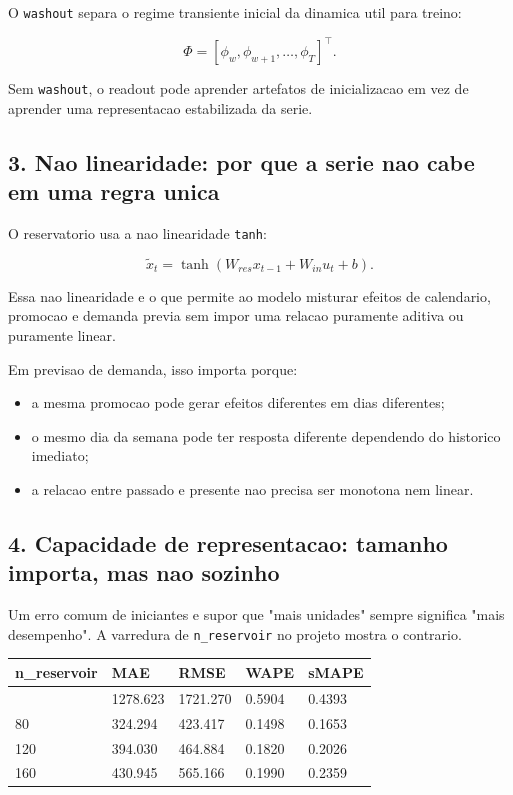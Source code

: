 \documentclass[12pt]{article}
\providecommand{\tightlist}{%
          \setlength{\itemsep}{0pt}\setlength{\parskip}{0pt}}
\begin{document}
O \texttt{washout} separa o regime transiente inicial da dinamica util para treino:

\[
\Phi = [\phi_w, \phi_{w+1}, \dots, \phi_T]^\top.
\]

Sem \texttt{washout}, o readout pode aprender artefatos de inicializacao em vez de aprender uma representacao estabilizada da serie.

\subsection{3. Nao linearidade: por que a serie nao cabe em uma regra unica}\label{3-nao-linearidade-por-que-a-serie-nao-cabe-em-uma-regra-unica}

O reservatorio usa a nao linearidade \texttt{tanh}:

\[
\widetilde{x}_t = \tanh(W_{res} x_{t-1} + W_{in} u_t + b).
\]

Essa nao linearidade e o que permite ao modelo misturar efeitos de calendario, promocao e demanda previa sem impor uma relacao puramente aditiva ou puramente linear.

Em previsao de demanda, isso importa porque:

\begin{itemize}
\tightlist
\item
  a mesma promocao pode gerar efeitos diferentes em dias diferentes;
\item
  o mesmo dia da semana pode ter resposta diferente dependendo do historico imediato;
\item
  a relacao entre passado e presente nao precisa ser monotona nem linear.
\end{itemize}

\subsection{4. Capacidade de representacao: tamanho importa, mas nao sozinho}\label{4-capacidade-de-representacao-tamanho-importa-mas-nao-sozinho}

Um erro comum de iniciantes e supor que "mais unidades" sempre significa "mais desempenho". A varredura de \texttt{n\_reservoir} no projeto mostra o contrario.

\begin{longtable}[]{@{}lllll@{}}
\toprule\noalign{}
n\_reservoir & MAE & RMSE & WAPE & sMAPE \\
\midrule\noalign{}
\endhead
\bottomrule\noalign{}
\endlastfoot
40 & 1278.623 & 1721.270 & 0.5904 & 0.4393 \\
80 & 324.294 & 423.417 & 0.1498 & 0.1653 \\
120 & 394.030 & 464.884 & 0.1820 & 0.2026 \\
160 & 430.945 & 565.166 & 0.1990 & 0.2359 \\
\end{longtable}
\end{document}
